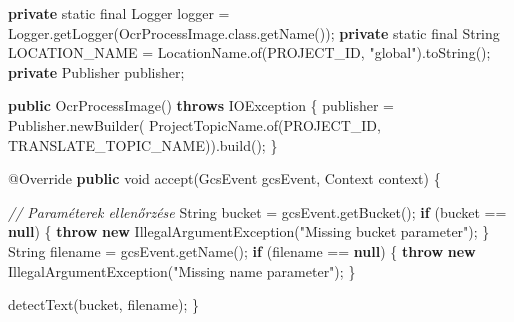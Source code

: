 \documentclass[
]{article}
\newenvironment{Shaded}{}{}
\newcommand{\AttributeTok}[1]{\textcolor[rgb]{0.49,0.56,0.16}{#1}}
\newcommand{\BuiltInTok}[1]{\textcolor[rgb]{0.00,0.50,0.00}{#1}}
\newcommand{\CommentTok}[1]{\textcolor[rgb]{0.38,0.63,0.69}{\textit{#1}}}
\newcommand{\ControlFlowTok}[1]{\textcolor[rgb]{0.00,0.44,0.13}{\textbf{#1}}}
\newcommand{\DataTypeTok}[1]{\textcolor[rgb]{0.56,0.13,0.00}{#1}}
\newcommand{\FunctionTok}[1]{\textcolor[rgb]{0.02,0.16,0.49}{#1}}
\newcommand{\KeywordTok}[1]{\textcolor[rgb]{0.00,0.44,0.13}{\textbf{#1}}}
\newcommand{\NormalTok}[1]{#1}
\newcommand{\OperatorTok}[1]{\textcolor[rgb]{0.40,0.40,0.40}{#1}}
\newcommand{\StringTok}[1]{\textcolor[rgb]{0.25,0.44,0.63}{#1}}
\begin{document}
\begin{Shaded}
\begin{Highlighting}[]
  \KeywordTok{private} \DataTypeTok{static} \DataTypeTok{final} \BuiltInTok{Logger}\NormalTok{ logger }\OperatorTok{=} \BuiltInTok{Logger}\OperatorTok{.}\FunctionTok{getLogger}\OperatorTok{(}\NormalTok{OcrProcessImage}\OperatorTok{.}\FunctionTok{class}\OperatorTok{.}\FunctionTok{getName}\OperatorTok{());}
  \KeywordTok{private} \DataTypeTok{static} \DataTypeTok{final} \BuiltInTok{String}\NormalTok{ LOCATION\_NAME }\OperatorTok{=}\NormalTok{ LocationName}\OperatorTok{.}\FunctionTok{of}\OperatorTok{(}\NormalTok{PROJECT\_ID}\OperatorTok{,} \StringTok{"global"}\OperatorTok{).}\FunctionTok{toString}\OperatorTok{();}
  \KeywordTok{private}\NormalTok{ Publisher publisher}\OperatorTok{;}

  \KeywordTok{public} \FunctionTok{OcrProcessImage}\OperatorTok{()} \KeywordTok{throws} \BuiltInTok{IOException} \OperatorTok{\{}
\NormalTok{    publisher }\OperatorTok{=}\NormalTok{ Publisher}\OperatorTok{.}\FunctionTok{newBuilder}\OperatorTok{(}
\NormalTok{        ProjectTopicName}\OperatorTok{.}\FunctionTok{of}\OperatorTok{(}\NormalTok{PROJECT\_ID}\OperatorTok{,}\NormalTok{ TRANSLATE\_TOPIC\_NAME}\OperatorTok{)).}\FunctionTok{build}\OperatorTok{();}
  \OperatorTok{\}}

  \AttributeTok{@Override}
  \KeywordTok{public} \DataTypeTok{void} \FunctionTok{accept}\OperatorTok{(}\NormalTok{GcsEvent gcsEvent}\OperatorTok{,} \BuiltInTok{Context}\NormalTok{ context}\OperatorTok{)} \OperatorTok{\{}

    \CommentTok{// Paraméterek ellenőrzése}
    \BuiltInTok{String}\NormalTok{ bucket }\OperatorTok{=}\NormalTok{ gcsEvent}\OperatorTok{.}\FunctionTok{getBucket}\OperatorTok{();}
    \ControlFlowTok{if} \OperatorTok{(}\NormalTok{bucket }\OperatorTok{==} \KeywordTok{null}\OperatorTok{)} \OperatorTok{\{}
      \ControlFlowTok{throw} \KeywordTok{new} \BuiltInTok{IllegalArgumentException}\OperatorTok{(}\StringTok{"Missing bucket parameter"}\OperatorTok{);}
    \OperatorTok{\}}
    \BuiltInTok{String}\NormalTok{ filename }\OperatorTok{=}\NormalTok{ gcsEvent}\OperatorTok{.}\FunctionTok{getName}\OperatorTok{();}
    \ControlFlowTok{if} \OperatorTok{(}\NormalTok{filename }\OperatorTok{==} \KeywordTok{null}\OperatorTok{)} \OperatorTok{\{}
      \ControlFlowTok{throw} \KeywordTok{new} \BuiltInTok{IllegalArgumentException}\OperatorTok{(}\StringTok{"Missing name parameter"}\OperatorTok{);}
    \OperatorTok{\}}

    \FunctionTok{detectText}\OperatorTok{(}\NormalTok{bucket}\OperatorTok{,}\NormalTok{ filename}\OperatorTok{);}
  \OperatorTok{\}}


\end{Highlighting}
\end{Shaded}
\end{document}
